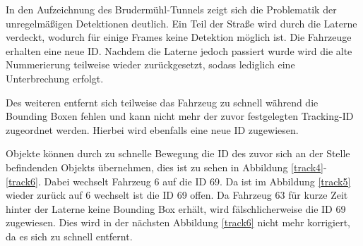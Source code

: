 \documentclass[conference]{IEEEtran}
\begin{document}
	In den Aufzeichnung des Brudermühl-Tunnels zeigt sich die Problematik der
	unregelmäßigen Detektionen deutlich. Ein Teil der Straße wird durch die Laterne
	verdeckt, wodurch für einige Frames keine Detektion möglich ist. Die Fahrzeuge
	erhalten eine neue ID. Nachdem die Laterne jedoch passiert wurde wird die alte
	Nummerierung teilweise wieder zurückgesetzt, sodass lediglich eine Unterbrechung
	erfolgt.
	
	Des weiteren entfernt sich teilweise das Fahrzeug zu schnell während die Bounding Boxen fehlen und kann nicht
	mehr der zuvor festgelegten Tracking-ID zugeordnet werden. Hierbei wird ebenfalls eine neue ID zugewiesen.
	
	Objekte können durch zu schnelle Bewegung die ID des zuvor sich an der Stelle
	befindenden Objekts übernehmen, dies ist zu sehen in Abbildung \ref{track4}-\ref{track6}.
	Dabei wechselt Fahrzeug 6 auf die ID 69. Da ist im Abbildung \ref{track5} wieder zurück auf 6
	wechselt ist die ID 69 offen. Da Fahrzeug 63 für kurze Zeit hinter der Laterne keine Bounding Box erhält, wird fälschlicherweise die ID 69 zugewiesen.
	Dies wird in der nächsten Abbildung \ref{track6} nicht mehr korrigiert, da es sich zu schnell entfernt.
	
\end{document}
